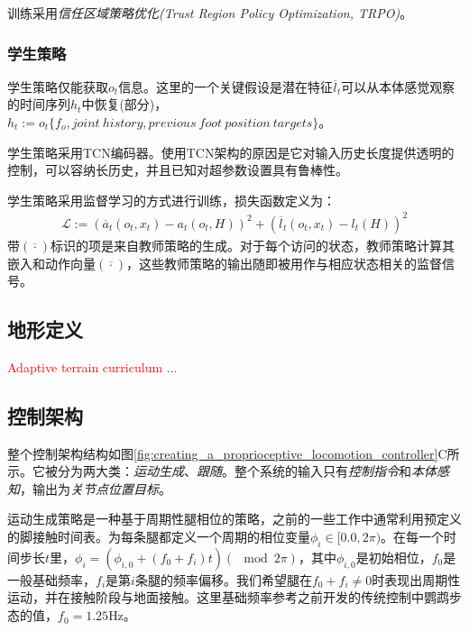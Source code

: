 训练采用\emph{信任区域策略优化(Trust Region Policy Optimization, TRPO)}\cite[p]{Schulman_Levine_Moritz_Jordan_Abbeel_2015}。

\subsubsection[学生策略]{学生策略}

学生策略仅能获取$o_t$信息。这里的一个关键假设是潜在特征$\overline{l}_t$可以从本体感觉观察的时间序列$h_t$中恢复(部分)，$h_t:=o_t\{f_o, joint\ history, previous\ foot\ position\ targets \}$。

学生策略采用TCN\cite[p]{Bai_Kolter_Koltun_2018}编码器。使用TCN架构的原因是它对输入历史长度提供透明的控制，可以容纳长历史，并且已知对超参数设置具有鲁棒性\cite[p]{Bai_Kolter_Koltun_2018}。

学生策略采用监督学习的方式进行训练，损失函数定义为：
\begin{align}
    \mathcal{L}:=(\overline{a}_t(o_t,x_t)-a_t(o_t,H))^2+(\overline{l}_t(o_t, x_t)-l_t(H))^2
\end{align}
带$(\overline{\cdot})$标识的项是来自教师策略的生成。对于每个访问的状态，教师策略计算其嵌入和动作向量$(\overline{\cdot})$，这些教师策略的输出随即被用作与相应状态相关的监督信号。


\subsection[地形定义]{地形定义}
\textcolor{red}{Adaptive terrain curriculum ...}

\subsection[控制架构]{控制架构}

整个控制架构结构如图\ref{fig:creating_a_proprioceptive_locomotion_controller}C所示。它被分为两大类：\emph{运动生成}、\emph{跟随}。整个系统的输入只有\emph{控制指令}和\emph{本体感知}，输出为\emph{关节点位置目标}。

运动生成策略是一种基于周期性腿相位的策略，之前的一些工作中通常利用预定义的脚接触时间表\cite[p7]{Bellicoso_Jenelten_Gehring_Hutter_2018,Barasuol_Buchli_Semini_Frigerio_De_Pieri_Caldwell_2013}。为每条腿都定义一个周期的相位变量$\phi_i\in[0.0,2\pi)$。在每一个时间步长$t$里，$\phi_i = (\phi_{i,0}+(f_0+f_i)t)(\mod 2\pi)$，其中$\phi_{i,0}$是初始相位，$f_0$是一般基础频率，$f_i$是第$i$条腿的频率偏移。我们希望腿在$f_0+f_i\neq 0$时表现出周期性运动，并在接触阶段与地面接触。这里基础频率参考之前开发的传统控制\cite[p7]{Bellicoso_Jenelten_Gehring_Hutter_2018}中鹦鹉步态的值，$f_0=1.25$Hz。

